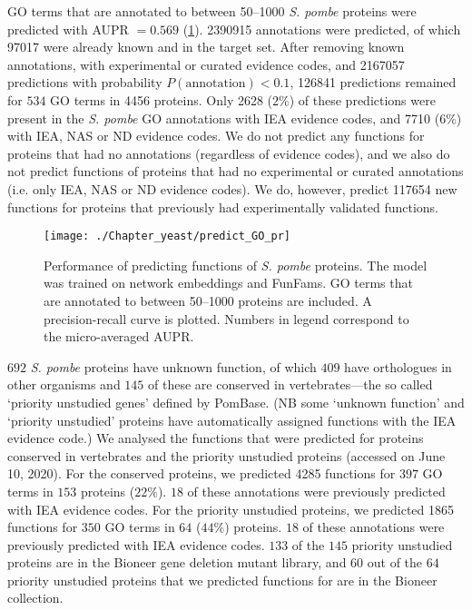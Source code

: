 GO terms that are annotated to between \numrange{50}{1000} \emph{S. pombe} proteins were predicted with AUPR $= 0.569$ (\ref{fig:predict_GO_pr}). \num{2390915} annotations were predicted, of which \num{97017} were already known and in the target set. After removing known annotations, with experimental or curated evidence codes, and \num{2167057} predictions with probability $P(\text{annotation}) < 0.1$, \num{126841} predictions remained for $534$ GO terms in \num{4456} proteins.
Only \num{2628} ($2\%$) of these predictions were present in the \emph{S. pombe} GO annotations with IEA evidence codes, and \num{7710} ($6\%$) with IEA, NAS or ND evidence codes. We do not predict any functions for proteins that had no annotations (regardless of evidence codes), and we also do not predict functions of proteins that had no experimental or curated annotations (i.e. only IEA, NAS or ND evidence codes). We do, however, predict \num{117654} new functions for proteins that previously had experimentally validated functions.

\begin{figure}[!hbt]
    \centering
    \texttt{[image: ./Chapter\_yeast/predict\_GO\_pr]}
    \caption{%
        Performance of predicting functions of \emph{S. pombe} proteins.
        The model was trained on network embeddings and FunFams.
        GO terms that are annotated to between \numrange{50}{1000} proteins are included.
        A precision-recall curve is plotted.
        Numbers in legend correspond to the micro-averaged AUPR.
    }
    \label{fig:predict_GO_pr}
\end{figure}

$692$ \emph{S. pombe} proteins have unknown function, of which $409$ have orthologues in other organisms and $145$ of these are conserved in vertebrates---the so called `priority unstudied genes' defined by PomBase. (NB some `unknown function' and `priority unstudied' proteins have automatically assigned functions with the IEA evidence code.) We analysed the functions that were predicted for proteins conserved in vertebrates and the priority unstudied proteins (accessed on June 10, 2020). For the conserved proteins, we predicted \num{4285} functions for $397$ GO terms in $153$ proteins ($22\%$). $18$ of these annotations were previously predicted with IEA evidence codes. For the priority unstudied proteins, we predicted \num{1865} functions for $350$ GO terms in $64$ ($44\%$) proteins. $18$ of these annotations were previously predicted with IEA evidence codes. $133$ of the $145$ priority unstudied proteins are in the Bioneer gene deletion mutant library, and $60$ out of the $64$ priority unstudied proteins that we predicted functions for are in the Bioneer collection.

